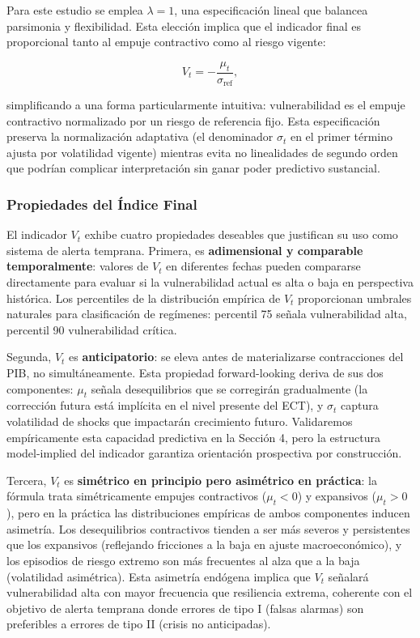 \documentclass[3p,11pt,draft,natbib=false]{elsarticle}
\begin{document}
Para este estudio se emplea $\lambda = 1$, una especificación lineal que balancea parsimonia y flexibilidad. Esta elección implica que el indicador final es proporcional tanto al empuje contractivo como al riesgo vigente:

\begin{equation}
V_t = -\frac{\mu_t}{\sigma_{\text{ref}}},
\label{eq:vulnerability_simplified}
\end{equation}

simplificando a una forma particularmente intuitiva: vulnerabilidad es el empuje contractivo normalizado por un riesgo de referencia fijo. Esta especificación preserva la normalización adaptativa (el denominador $\sigma_t$ en el primer término ajusta por volatilidad vigente) mientras evita no linealidades de segundo orden que podrían complicar interpretación sin ganar poder predictivo sustancial.

\subsubsection{Propiedades del Índice Final}

El indicador $V_t$ exhibe cuatro propiedades deseables que justifican su uso como sistema de alerta temprana. Primera, es \textbf{adimensional y comparable temporalmente}: valores de $V_t$ en diferentes fechas pueden compararse directamente para evaluar si la vulnerabilidad actual es alta o baja en perspectiva histórica. Los percentiles de la distribución empírica de $V_t$ proporcionan umbrales naturales para clasificación de regímenes: percentil 75 señala vulnerabilidad alta, percentil 90 vulnerabilidad crítica.

Segunda, $V_t$ es \textbf{anticipatorio}: se eleva antes de materializarse contracciones del PIB, no simultáneamente. Esta propiedad forward-looking deriva de sus dos componentes: $\mu_t$ señala desequilibrios que se corregirán gradualmente (la corrección futura está implícita en el nivel presente del ECT), y $\sigma_t$ captura volatilidad de shocks que impactarán crecimiento futuro. Validaremos empíricamente esta capacidad predictiva en la Sección 4, pero la estructura model-implied del indicador garantiza orientación prospectiva por construcción.

Tercera, $V_t$ es \textbf{simétrico en principio pero asimétrico en práctica}: la fórmula trata simétricamente empujes contractivos ($\mu_t < 0$) y expansivos ($\mu_t > 0$), pero en la práctica las distribuciones empíricas de ambos componentes inducen asimetría. Los desequilibrios contractivos tienden a ser más severos y persistentes que los expansivos (reflejando fricciones a la baja en ajuste macroeconómico), y los episodios de riesgo extremo son más frecuentes al alza que a la baja (volatilidad asimétrica). Esta asimetría endógena implica que $V_t$ señalará vulnerabilidad alta con mayor frecuencia que resiliencia extrema, coherente con el objetivo de alerta temprana donde errores de tipo I (falsas alarmas) son preferibles a errores de tipo II (crisis no anticipadas).
\end{document}
